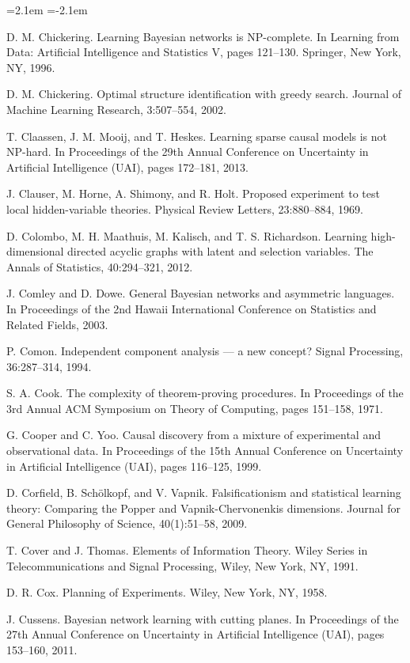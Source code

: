 \begin{list}{}{\leftmargin=2.1em
 \itemindent=-2.1em\parsep=0pt\itemsep=3pt}
\item D. M. Chickering. Learning Bayesian networks is NP-complete. In Learning from Data: Artificial Intelligence and Statistics V, pages 121--130. Springer, New York, NY, 1996.
\item D. M. Chickering. Optimal structure identification with greedy search. Journal of Machine Learning Research, 3:507--554, 2002.
\item T. Claassen, J. M. Mooij, and T. Heskes. Learning sparse causal models is not NP-hard. In Proceedings of the 29th Annual Conference on Uncertainty in Artificial Intelligence (UAI), pages 172--181, 2013.
\item J. Clauser, M. Horne, A. Shimony, and R. Holt. Proposed experiment to test local hidden-variable theories. Physical Review Letters, 23:880--884, 1969.
\item D. Colombo, M. H. Maathuis, M. Kalisch, and T. S. Richardson. Learning high-dimensional directed acyclic graphs with latent and selection variables. The Annals of Statistics, 40:294--321, 2012.
\item J. Comley and D. Dowe. General Bayesian networks and asymmetric languages. In Proceedings of the 2nd Hawaii International Conference on Statistics and Related Fields, 2003.
\item P. Comon. Independent component analysis --- a new concept? Signal Processing, 36:287--314, 1994.
\item S. A. Cook. The complexity of theorem-proving procedures. In Proceedings of the 3rd Annual ACM Symposium on Theory of Computing, pages 151--158, 1971.
\item G. Cooper and C. Yoo. Causal discovery from a mixture of experimental and observational data. In Proceedings of the 15th Annual Conference on Uncertainty in Artificial Intelligence (UAI), pages 116--125, 1999.
\item D. Corfield, B. Schölkopf, and V. Vapnik. Falsificationism and statistical learning theory: Comparing the Popper and Vapnik-Chervonenkis dimensions. Journal for General Philosophy of Science, 40(1):51--58, 2009.
\item T. Cover and J. Thomas. Elements of Information Theory. Wiley Series in Telecommunications and Signal Processing, Wiley, New York, NY, 1991.
\item D. R. Cox. Planning of Experiments. Wiley, New York, NY, 1958.
\item J. Cussens. Bayesian network learning with cutting planes. In Proceedings of the 27th Annual Conference on Uncertainty in Artificial Intelligence (UAI), pages 153--160, 2011.

\end{list}
